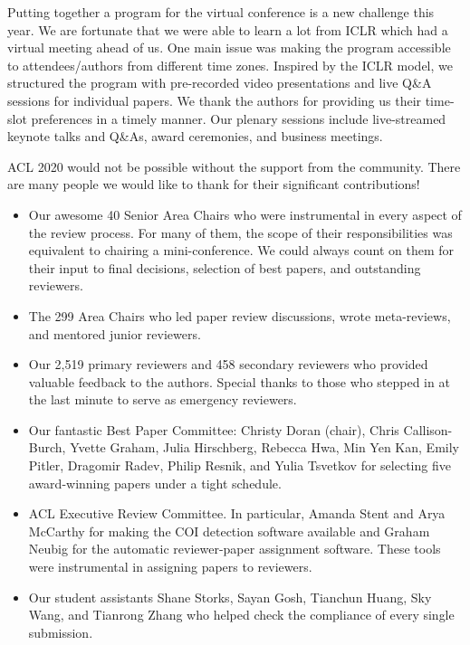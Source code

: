 \documentclass[11pt]{article}
\begin{document}
Putting together a program for the virtual conference is a new challenge this year. We are fortunate that we were able to learn a lot from ICLR which had a virtual meeting ahead of us. One main issue was making the program accessible to attendees/authors from different time zones.  Inspired by the ICLR model, we structured the program with pre-recorded video presentations and live Q\&A sessions for individual papers. We thank the authors for providing us their time-slot preferences in a timely manner.  Our plenary sessions include live-streamed keynote talks and Q\&As, award ceremonies, and business meetings.  

ACL 2020 would not be possible without the support from the community. There are many people we would like to thank for their significant contributions!

\begin{itemize}
\item Our awesome 40 Senior Area Chairs who were instrumental in every aspect of the review process. For many of them, the scope of their responsibilities was equivalent to chairing a mini-conference. We could always count on them for their input to final decisions, selection of best papers, and outstanding reviewers.

\item The 299 Area Chairs who led paper review discussions, wrote meta-reviews, and mentored junior reviewers. 
 
\item Our 2,519 primary reviewers and 458 secondary reviewers who provided valuable feedback to the authors. Special thanks to those who stepped in at the last minute to serve as emergency reviewers. 

\item Our fantastic Best Paper Committee: Christy Doran (chair), Chris Callison-Burch, Yvette Graham, Julia Hirschberg, Rebecca Hwa, Min Yen Kan, Emily Pitler, Dragomir Radev, Philip Resnik, and Yulia Tsvetkov for selecting five award-winning papers under a tight schedule. 

\item ACL Executive Review Committee.  In particular, Amanda Stent and Arya McCarthy for making the COI detection software available and Graham Neubig for the automatic reviewer-paper assignment software. These tools were instrumental in assigning papers to reviewers. 

\item Our student assistants Shane Storks, Sayan Gosh, Tianchun Huang, Sky Wang, and Tianrong Zhang who helped check the compliance of every single submission. 


\end{itemize}
\end{document}
